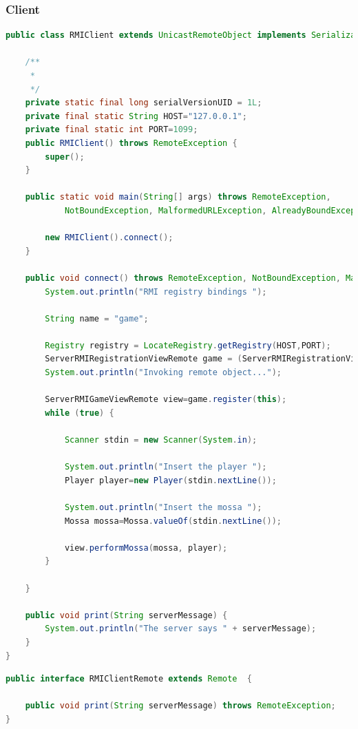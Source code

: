 \documentclass{article}
\begin{document}
\subsubsection{Client}
\begin{lstlisting}[language=Java,escapechar=|]
public class RMIClient extends UnicastRemoteObject implements Serializable, RMIClientRemote {

	/**
	 * 
	 */
	private static final long serialVersionUID = 1L;
	private final static String HOST="127.0.0.1";
	private final static int PORT=1099;
	public RMIClient() throws RemoteException {
		super();
	}

	public static void main(String[] args) throws RemoteException,
			NotBoundException, MalformedURLException, AlreadyBoundException {

		new RMIClient().connect();
	}

	public void connect() throws RemoteException, NotBoundException, MalformedURLException, AlreadyBoundException {
		System.out.println("RMI registry bindings ");

		String name = "game";
		
		Registry registry = LocateRegistry.getRegistry(HOST,PORT);
		ServerRMIRegistrationViewRemote game = (ServerRMIRegistrationViewRemote) registry.lookup(name);
		System.out.println("Invoking remote object...");

		ServerRMIGameViewRemote view=game.register(this);
		while (true) {
			
			Scanner stdin = new Scanner(System.in);

			System.out.println("Insert the player ");
			Player player=new Player(stdin.nextLine());
			
			System.out.println("Insert the mossa ");
			Mossa mossa=Mossa.valueOf(stdin.nextLine());
			
			view.performMossa(mossa, player);
		}

	}

	public void print(String serverMessage) {
		System.out.println("The server says " + serverMessage);
	}
}
\end{lstlisting}

\begin{lstlisting}[language=Java,escapechar=|]
public interface RMIClientRemote extends Remote  {

	public void print(String serverMessage) throws RemoteException;
}
\end{lstlisting}



\clearpage







\nocite{*}
\end{document}

